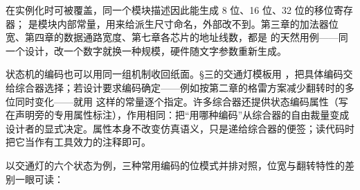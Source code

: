  在实例化时可被覆盖，同一个模块描述因此能生成 8 位、16 位、32 位的移位寄存器； 是模块内部常量，用来给派生尺寸命名，外部改不到。第三章的加法器位宽、第四章的数据通路宽度、第七章各芯片的地址线数，都是  的天然用例——同一个设计，改一个数字就换一种规模，硬件随文字参数重新生成。

状态机的编码也可以用同一组机制收回纸面。§三的交通灯模板用 ，把具体编码交给综合器选择；若设计要求编码确定——例如按第二章的格雷方案减少翻转时的多位同时变化——就用  这样的常量逐个指定。许多综合器还提供状态编码属性（写在声明旁的专用属性标注），作用相同：把“用哪种编码”从综合器的自由裁量变成设计者的显式决定。属性本身不改变仿真语义，只是递给综合器的便签；读代码时把它当作有工具效力的注释即可。

以交通灯的六个状态为例，三种常用编码的位模式并排对照，位宽与翻转特性的差别一眼可读：

